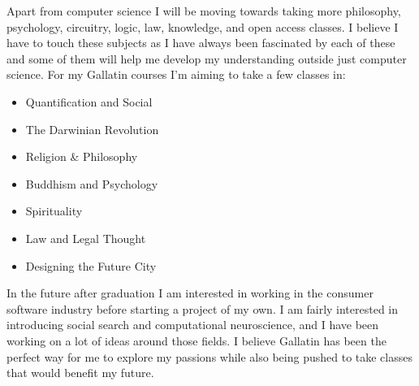 \documentclass[11pt, oneside]{article}   	%
\begin{document}
\par Apart from computer science I will be moving towards taking more philosophy, psychology, circuitry, logic, law, knowledge, and open access classes. I believe I have to touch these subjects as I have always been fascinated by each of these and some of them will help me develop my understanding outside just computer science. For my Gallatin courses I'm aiming to take a few classes in:

\begin{itemize}
\item Quantification and Social
\item The Darwinian Revolution
\item Religion \& Philosophy
\item Buddhism and Psychology
\item Spirituality
\item Law and Legal Thought
\item Designing the Future City
\end{itemize}

\par In the future after graduation I am interested in working in the consumer software industry before starting a project of my own. I am fairly interested in introducing social search and computational neuroscience, and I have been working on a lot of ideas around those fields. I believe Gallatin has been the perfect way for me to explore my passions while also being pushed to take classes that would benefit my future.
\end{document}
